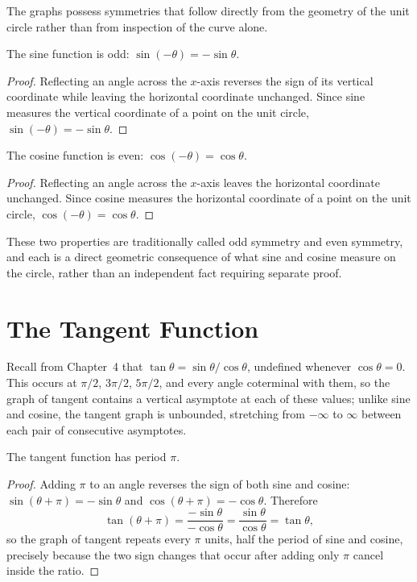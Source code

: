 The graphs possess symmetries that follow directly from the geometry of the
unit circle rather than from inspection of the curve alone.

\begin{theorem}
The sine function is odd: $\sin(-\theta) = -\sin\theta$.
\end{theorem}

\begin{proof}
Reflecting an angle across the $x$-axis reverses the sign of its vertical
coordinate while leaving the horizontal coordinate unchanged. Since sine
measures the vertical coordinate of a point on the unit circle,
$\sin(-\theta) = -\sin\theta$.
\end{proof}

\begin{theorem}
The cosine function is even: $\cos(-\theta) = \cos\theta$.
\end{theorem}

\begin{proof}
Reflecting an angle across the $x$-axis leaves the horizontal coordinate
unchanged. Since cosine measures the horizontal coordinate of a point on
the unit circle, $\cos(-\theta) = \cos\theta$.
\end{proof}

These two properties are traditionally called odd symmetry and even
symmetry, and each is a direct geometric consequence of what sine and
cosine measure on the circle, rather than an independent fact requiring
separate proof.

\section{The Tangent Function}

Recall from Chapter~4 that $\tan\theta = \sin\theta/\cos\theta$, undefined
whenever $\cos\theta = 0$. This occurs at $\pi/2$, $3\pi/2$, $5\pi/2$, and
every angle coterminal with them, so the graph of tangent contains a
vertical asymptote at each of these values; unlike sine and cosine, the
tangent graph is unbounded, stretching from $-\infty$ to $\infty$ between
each pair of consecutive asymptotes.

\begin{theorem}
The tangent function has period $\pi$.
\end{theorem}

\begin{proof}
Adding $\pi$ to an angle reverses the sign of both sine and cosine:
$\sin(\theta+\pi) = -\sin\theta$ and $\cos(\theta+\pi) = -\cos\theta$.
Therefore
\[
\tan(\theta+\pi) = \frac{-\sin\theta}{-\cos\theta} = \frac{\sin\theta}{\cos\theta} = \tan\theta,
\]
so the graph of tangent repeats every $\pi$ units, half the period of sine
and cosine, precisely because the two sign changes that occur after adding
only $\pi$ cancel inside the ratio.
\end{proof}


